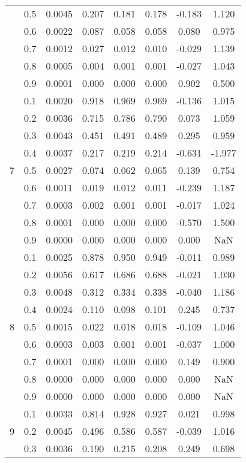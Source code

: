 \documentclass[11pt,a4paper]{report}
\begin{document}
\begin{longtable}{ | c | c || c | c | c | c | c | c | }
 & 0.5 & 0.0045 & 0.207 & 0.181 & 0.178 & -0.183 & 1.120 \\
 & 0.6 & 0.0022 & 0.087 & 0.058 & 0.058 & 0.080 & 0.975 \\
 & 0.7 & 0.0012 & 0.027 & 0.012 & 0.010 & -0.029 & 1.139 \\
 & 0.8 & 0.0005 & 0.004 & 0.001 & 0.001 & -0.027 & 1.043 \\
 & 0.9 & 0.0001 & 0.000 & 0.000 & 0.000 & 0.902 & 0.500 \\
 \hline
\multirow{9}{*}{7} & 0.1 & 0.0020 & 0.918 & 0.969 & 0.969 & -0.136 & 1.015 \\
 & 0.2 & 0.0036 & 0.715 & 0.786 & 0.790 & 0.073 & 1.059 \\
 & 0.3 & 0.0043 & 0.451 & 0.491 & 0.489 & 0.295 & 0.959 \\
 & 0.4 & 0.0037 & 0.217 & 0.219 & 0.214 & -0.631 & -1.977 \\
 & 0.5 & 0.0027 & 0.074 & 0.062 & 0.065 & 0.139 & 0.754 \\
 & 0.6 & 0.0011 & 0.019 & 0.012 & 0.011 & -0.239 & 1.187 \\
 & 0.7 & 0.0003 & 0.002 & 0.001 & 0.001 & -0.017 & 1.024 \\
 & 0.8 & 0.0001 & 0.000 & 0.000 & 0.000 & -0.570 & 1.500 \\
 & 0.9 & 0.0000 & 0.000 & 0.000 & 0.000 & 0.000 & NaN \\
 \hline
\multirow{9}{*}{8} & 0.1 & 0.0025 & 0.878 & 0.950 & 0.949 & -0.011 & 0.989 \\
 & 0.2 & 0.0056 & 0.617 & 0.686 & 0.688 & -0.021 & 1.030 \\
 & 0.3 & 0.0048 & 0.312 & 0.334 & 0.338 & -0.040 & 1.186 \\
 & 0.4 & 0.0024 & 0.110 & 0.098 & 0.101 & 0.245 & 0.737 \\
 & 0.5 & 0.0015 & 0.022 & 0.018 & 0.018 & -0.109 & 1.046 \\
 & 0.6 & 0.0003 & 0.003 & 0.001 & 0.001 & -0.037 & 1.000 \\
 & 0.7 & 0.0001 & 0.000 & 0.000 & 0.000 & 0.149 & 0.900 \\
 & 0.8 & 0.0000 & 0.000 & 0.000 & 0.000 & 0.000 & NaN \\
 & 0.9 & 0.0000 & 0.000 & 0.000 & 0.000 & 0.000 & NaN \\
 \hline
\multirow{9}{*}{9} & 0.1 & 0.0033 & 0.814 & 0.928 & 0.927 & 0.021 & 0.998 \\
 & 0.2 & 0.0045 & 0.496 & 0.586 & 0.587 & -0.039 & 1.016 \\
 & 0.3 & 0.0036 & 0.190 & 0.215 & 0.208 & 0.249 & 0.698 \\

\end{longtable}
\end{document}
